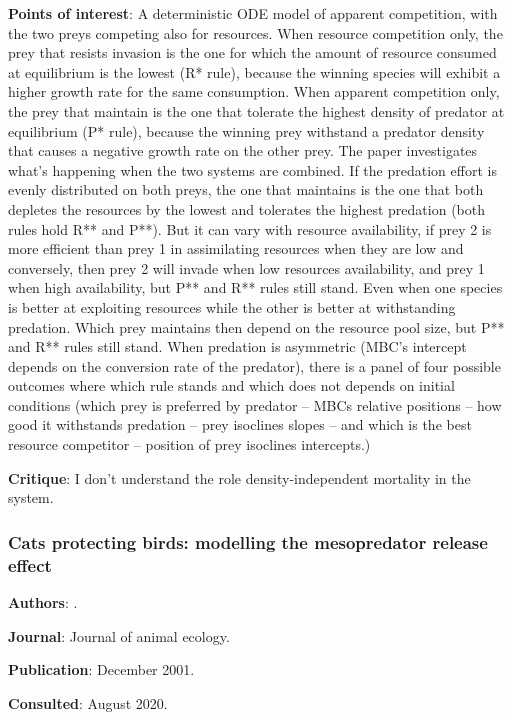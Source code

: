 \documentclass[12pt,a4paper]{article}
\begin{document}
\textbf{Points of interest}: A deterministic ODE model of apparent competition, with the two preys competing also for resources. When resource competition only, the prey that resists invasion is the one for which the amount of resource consumed at equilibrium is the lowest (R* rule), because the winning species will exhibit a higher growth rate for the same consumption. When apparent competition only, the prey that maintain is the one that tolerate the highest density of predator at equilibrium (P* rule), because the winning prey withstand a predator density that causes a negative growth rate on the other prey. The paper investigates what's happening when the two systems are combined. If the predation effort is evenly distributed on both preys, the one that maintains is the one that both depletes the resources by the lowest and tolerates the highest predation (both rules hold R** and P**). But it can vary with resource availability, if prey 2 is more efficient than prey 1 in assimilating resources when they are low and conversely, then prey 2 will invade when low resources availability, and prey 1 when high availability, but P** and R** rules still stand. Even when one species is better at exploiting resources while the other is better at withstanding predation. Which prey maintains then depend on the resource pool size, but P** and R** rules still stand. When predation is asymmetric (MBC's intercept depends on the conversion rate of the predator), there is a panel of four possible outcomes where which rule stands and which does not depends on initial conditions (which prey is preferred by predator -- MBCs relative positions -- how good it withstands predation -- prey isoclines slopes -- and which is the best resource competitor -- position of prey isoclines intercepts.)

\textbf{Critique}: I don't understand the role density-independent mortality in the system. 

\newpage

\subsubsection*{Cats protecting birds: modelling the mesopredator release effect}

\textbf{Authors}: \cite{courchamp1999cats}.

\textbf{Journal}: Journal of animal ecology.

\textbf{Publication}: December 2001.

\textbf{Consulted}: August 2020.
\end{document}

